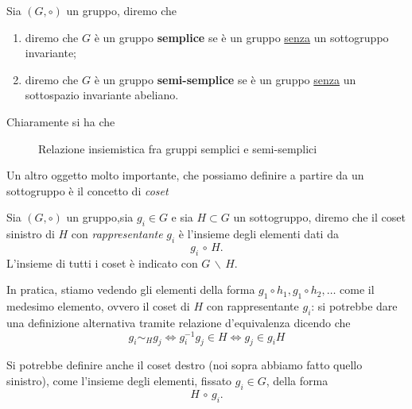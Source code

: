 \begin{definition}
	Sia $(G, \circ)$ un gruppo, diremo che
	\begin{enumerate}[label=\protect\circled{\arabic*}]
		\item diremo che $G$ è un gruppo \textbf{semplice} se è un gruppo \underline{senza} un sottogruppo invariante;
		\item diremo che $G$ è un gruppo \textbf{semi-semplice} se è un gruppo \underline{senza} un sottospazio invariante abeliano.
	\end{enumerate}
\end{definition}
\begin{remark}
	Chiaramente si ha che
	\begin{figure}[H]
		\centering
		\caption{Relazione insiemistica fra gruppi semplici e semi-semplici}
	\end{figure}
\end{remark}

Un altro oggetto molto importante, che possiamo definire a partire da un sottogruppo è il concetto di \emph{coset}
\begin{definition}[coset]
	Sia $(G, \circ)$ un gruppo,sia $g_i \in G$ e sia $H \subset G$ un sottogruppo, diremo che il coset sinistro di $H$ con \emph{rappresentante} $g_i$ è l'insieme degli elementi dati da
	\begin{equation}
		g_i \, \circ \, H. 
	\end{equation}
	L'insieme di tutti i coset è indicato con $G \, \backslash \, H$.
\end{definition}
\begin{remark}
	In pratica, stiamo vedendo gli elementi della forma $g_1 \circ h_1, g_1 \circ h_2, \ldots$ come il medesimo elemento, ovvero il coset di $H$ con rappresentante $g_i$: si potrebbe dare una definizione alternativa
	tramite relazione d'equivalenza dicendo che
	$$
		g_i \sim_H g_j \iff g_i^{-1} g_j \in H \iff g_j \in g_i H 
	$$
\end{remark}

\begin{remark}
	Si potrebbe definire anche il coset destro (noi sopra abbiamo fatto quello sinistro), come l'insieme degli elementi, fissato $g_i \in G$, della forma
	\begin{equation}
		H \, \circ \, g_i.
	\end{equation}
\end{remark}

